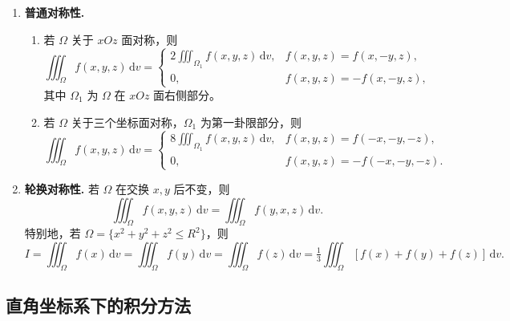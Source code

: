 \begin{enumerate}
      \item \textbf{普通对称性.}
            \begin{enumerate}
                  \item 若 $\Omega$ 关于 $xOz$ 面对称，则
                        \[
                              \iiint_{\Omega} f(x, y, z)\, \mathrm{d}v =
                              \begin{cases}
                                    2\iiint_{\Omega_1} f(x,y,z)\, \mathrm{d}v, & f(x,y,z) = f(x,-y,z),  \\[4pt]
                                    0,                                         & f(x,y,z) = -f(x,-y,z),
                              \end{cases}
                        \]
                        其中 $\Omega_1$ 为 $\Omega$ 在 $xOz$ 面右侧部分。
                  \item 若 $\Omega$ 关于三个坐标面对称，$\Omega_1$ 为第一卦限部分，则
                        \[
                              \iiint_{\Omega} f(x,y,z)\, \mathrm{d}v =
                              \begin{cases}
                                    8\iiint_{\Omega_1} f(x,y,z)\, \mathrm{d}v, & f(x,y,z)=f(-x,-y,-z),  \\[4pt]
                                    0,                                         & f(x,y,z)=-f(-x,-y,-z).
                              \end{cases}
                        \]
            \end{enumerate}

      \item \textbf{轮换对称性.}
            若 $\Omega$ 在交换 $x,y$ 后不变，则
            \[
                  \iiint_{\Omega} f(x,y,z)\, \mathrm{d}v
                  = \iiint_{\Omega} f(y,x,z)\, \mathrm{d}v.
            \]
            特别地，若 $\Omega=\{x^2+y^2+z^2\le R^2\}$，则
            \[
                  I = \iiint_{\Omega} f(x)\, \mathrm{d}v
                  = \iiint_{\Omega} f(y)\, \mathrm{d}v
                  = \iiint_{\Omega} f(z)\, \mathrm{d}v
                  = \tfrac{1}{3} \iiint_{\Omega} [f(x)+f(y)+f(z)]\, \mathrm{d}v.
            \]
\end{enumerate}

\subsection{直角坐标系下的积分方法}

